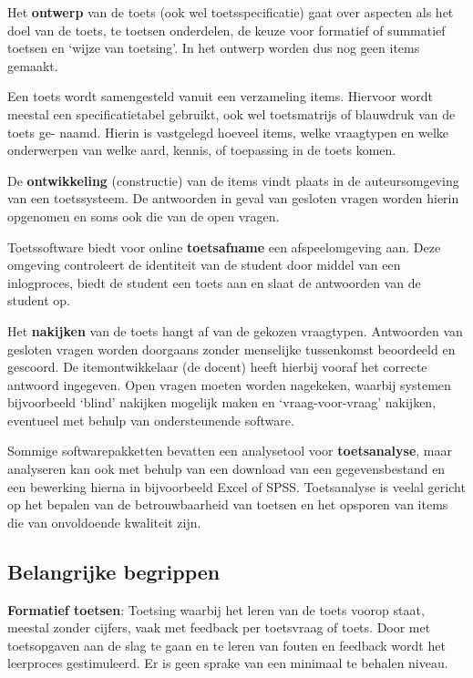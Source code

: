 \documentclass[
]{book}
\begin{document}
Het \textbf{ontwerp} van de toets (ook wel toetsspecificatie) gaat over aspecten als het doel van de toets, te toetsen onderdelen, de keuze voor formatief of summatief toetsen en `wijze van toetsing'. In het ontwerp worden dus nog geen items gemaakt.

Een toets wordt samengesteld vanuit een verzameling items. Hiervoor wordt meestal een specificatietabel gebruikt, ook wel toetsmatrijs of blauwdruk van de toets ge- naamd. Hierin is vastgelegd hoeveel items, welke vraagtypen en welke onderwerpen van welke aard, kennis, of toepassing in de toets komen.

De \textbf{ontwikkeling} (constructie) van de items vindt plaats in de auteursomgeving van een toetssysteem. De antwoorden in geval van gesloten vragen worden hierin opgenomen en soms ook die van de open vragen.

Toetssoftware biedt voor online \textbf{toetsafname} een afspeelomgeving aan. Deze omgeving controleert de identiteit van de student door middel van een inlogproces, biedt de student een toets aan en slaat de antwoorden van de student op.

Het \textbf{nakijken} van de toets hangt af van de gekozen vraagtypen. Antwoorden van gesloten vragen worden doorgaans zonder menselijke tussenkomst beoordeeld en gescoord. De itemontwikkelaar (de docent) heeft hierbij vooraf het correcte antwoord ingegeven. Open vragen moeten worden nagekeken, waarbij systemen bijvoorbeeld `blind' nakijken mogelijk maken en `vraag-voor-vraag' nakijken, eventueel met behulp van ondersteunende software.

Sommige softwarepakketten bevatten een analysetool voor \textbf{toetsanalyse}, maar analyseren kan ook met behulp van een download van een gegevensbestand en een bewerking hierna in bijvoorbeeld Excel of SPSS. Toetsanalyse is veelal gericht op het bepalen van de betrouwbaarheid van toetsen en het opsporen van items die van onvoldoende kwaliteit zijn.

\hypertarget{belangrijke-begrippen}{%
\subsection{Belangrijke begrippen}\label{belangrijke-begrippen}}

\textbf{Formatief toetsen}: Toetsing waarbij het leren van de toets voorop staat, meestal zonder cijfers, vaak met feedback per toetsvraag of toets. Door met toetsopgaven aan de slag te gaan en te leren van fouten en feedback wordt het leerproces gestimuleerd. Er is geen sprake van een minimaal te behalen niveau.
\end{document}
